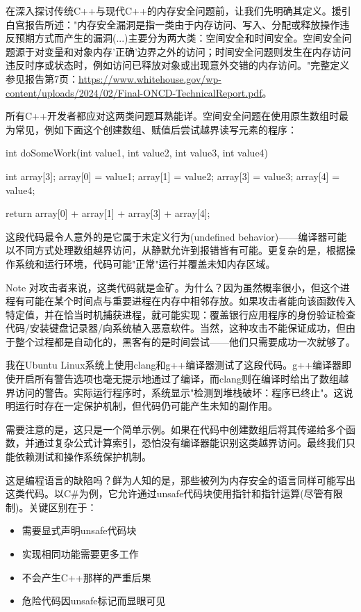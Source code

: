 
在深入探讨传统C++与现代C++的内存安全问题前，让我们先明确其定义。援引白宫报告所述："内存安全漏洞是指一类由于内存访问、写入、分配或释放操作违反预期方式而产生的漏洞(...)主要分为两大类：空间安全和时间安全。空间安全问题源于对变量和对象内存'正确'边界之外的访问；时间安全问题则发生在内存访问违反时序或状态时，例如访问已释放对象或出现意外交错的内存访问。"完整定义参见报告第7页：\url{https://www.whitehouse.gov/wp-content/uploads/2024/02/Final-ONCD-TechnicalReport.pdf}。

所有C++开发者都应对这两类问题耳熟能详。空间安全问题在使用原生数组时最为常见，例如下面这个创建数组、赋值后尝试越界读写元素的程序：

\begin{cpp}
int doSomeWork(int value1, int value2, int value3, int value4) {
  int array[3];
  array[0] = value1;
  array[1] = value2;
  array[3] = value3;
  array[4] = value4;

  return array[0] + array[1] + array[3] + array[4];
}
\end{cpp}

这段代码最令人意外的是它属于未定义行为(undefined behavior)——编译器可能以不同方式处理数组越界访问，从静默允许到报错皆有可能。更复杂的是，根据操作系统和运行环境，代码可能"正常"运行并覆盖未知内存区域。

\begin{myNotic}{Note}
对攻击者来说，这类代码就是金矿。为什么？因为虽然概率很小，但这个进程有可能在某个时间点与重要进程在内存中相邻存放。如果攻击者能向该函数传入特定值，并在恰当时机捕获进程，就可能实现：覆盖银行应用程序的身份验证检查代码/安装键盘记录器/向系统植入恶意软件。当然，这种攻击不能保证成功，但由于整个过程都是自动化的，黑客有的是时间尝试——他们只需要成功一次就够了。
\end{myNotic}

我在Ubuntu Linux系统上使用clang和g++编译器测试了这段代码。g++编译器即使开启所有警告选项也毫无提示地通过了编译，而clang则在编译时给出了数组越界访问的警告。实际运行程序时，系统显示"检测到堆栈破坏：程序已终止"。这说明运行时存在一定保护机制，但代码仍可能产生未知的副作用。

需要注意的是，这只是一个简单示例。如果在代码中创建数组后将其传递给多个函数，并通过复杂公式计算索引，恐怕没有编译器能识别这类越界访问。最终我们只能依赖测试和操作系统保护机制。

这是编程语言的缺陷吗？鲜为人知的是，那些被列为内存安全的语言同样可能写出这类代码。以C\#为例，它允许通过unsafe代码块使用指针和指针运算(尽管有限制)。关键区别在于：

\begin{itemize}
\item 
需要显式声明unsafe代码块

\item 
实现相同功能需要更多工作

\item 
不会产生C++那样的严重后果

\item 
危险代码因unsafe标记而显眼可见
\end{itemize}

